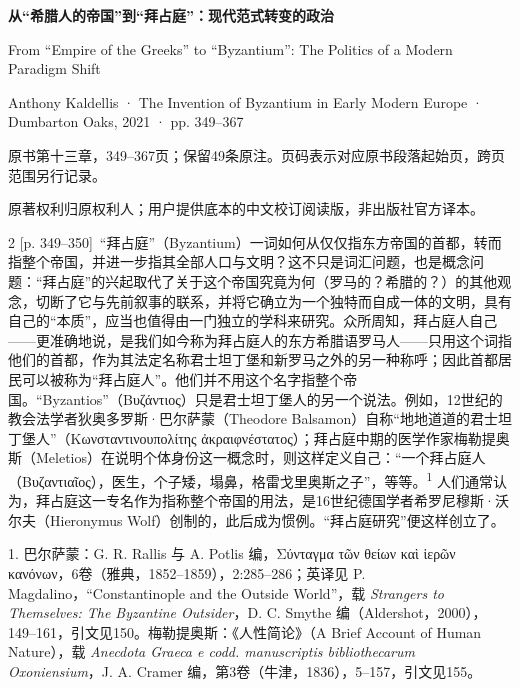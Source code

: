 \documentclass[10pt,a4paper]{article}
\begin{document}
{\Large\bfseries 从“希腊人的帝国”到“拜占庭”：现代范式转变的政治\par}\medskip
From “Empire of the Greeks” to “Byzantium”: The Politics of a Modern Paradigm Shift\par
Anthony Kaldellis · The Invention of Byzantium in Early Modern Europe · Dumbarton Oaks, 2021 · pp. 349–367\par
原书第十三章，349–367页；保留49条原注。页码表示对应原书段落起始页，跨页范围另行记录。\par
原著权利归原权利人；用户提供底本的中文校订阅读版，非出版社官方译本。\par\bigskip
\begin{paracol}{2}
{\scriptsize\color{gray}[p. 349–350]}\ “拜占庭”（Byzantium）一词如何从仅仅指东方帝国的首都，转而指整个帝国，并进一步指其全部人口与文明？这不只是词汇问题，也是概念问题：“拜占庭”的兴起取代了关于这个帝国究竟为何（罗马的？希腊的？）的其他观念，切断了它与先前叙事的联系，并将它确立为一个独特而自成一体的文明，具有自己的“本质”，应当也值得由一门独立的学科来研究。众所周知，拜占庭人自己——更准确地说，是我们如今称为拜占庭人的东方希腊语罗马人——只用这个词指他们的首都，作为其法定名称君士坦丁堡和新罗马之外的另一种称呼；因此首都居民可以被称为“拜占庭人”。他们并不用这个名字指整个帝国。“Byzantios”（Βυζάντιος）只是君士坦丁堡人的另一个说法。例如，12世纪的教会法学者狄奥多罗斯·巴尔萨蒙（Theodore Balsamon）自称“地地道道的君士坦丁堡人”（Κωνσταντινουπολίτης ἀκραιφνέστατος）；拜占庭中期的医学作家梅勒提奥斯（Meletios）在说明个体身份这一概念时，则这样定义自己：“一个拜占庭人（Βυζαντιαῖος），医生，个子矮，塌鼻，格雷戈里奥斯之子”，等等。\nobreak\textsuperscript{1} 人们通常认为，拜占庭这一专名作为指称整个帝国的用法，是16世纪德国学者希罗尼穆斯·沃尔夫（Hieronymus Wolf）创制的，此后成为惯例。“拜占庭研究”便这样创立了。\par{\small 1. 巴尔萨蒙：G. R. Rallis 与 A. Potlis 编，Σύνταγμα τῶν θείων καὶ ἱερῶν κανόνων，6卷（雅典，1852–1859），2:285–286；英译见 P. Magdalino，“Constantinople and the Outside World”，载 \textit{Strangers to Themselves: The Byzantine Outsider}，D. C. Smythe 编（Aldershot，2000），149–161，引文见150。梅勒提奥斯：《人性简论》（A Brief Account of Human Nature），载 \textit{Anecdota Graeca e codd. manuscriptis bibliothecarum Oxoniensium}，J. A. Cramer 编，第3卷（牛津，1836），5–157，引文见155。\par}
\switchcolumn

\end{paracol}
\end{document}
